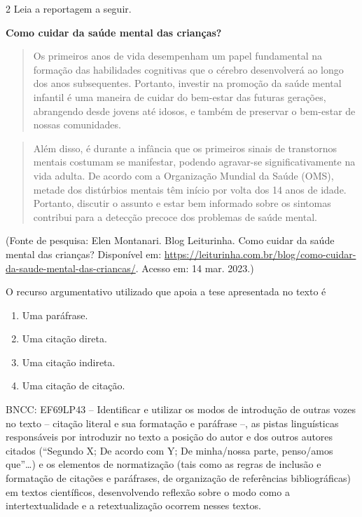\num{2} Leia a reportagem a seguir.

\textbf{Como cuidar da saúde mental das crianças?}

\begin{quote}
Os primeiros anos de vida desempenham um papel fundamental na formação
das habilidades cognitivas que o cérebro desenvolverá ao longo dos anos
subsequentes. Portanto, investir na promoção da saúde mental infantil é
uma maneira de cuidar do bem-estar das futuras gerações, abrangendo
desde jovens até idosos, e também de preservar o bem-estar de nossas
comunidades.
\end{quote}

\begin{quote}
Além disso, é durante a infância que os primeiros sinais de transtornos
mentais costumam se manifestar, podendo agravar-se significativamente na
vida adulta. De acordo com a Organização Mundial da Saúde (OMS), metade
dos distúrbios mentais têm início por volta dos 14 anos de idade.
Portanto, discutir o assunto e estar bem informado sobre os sintomas
contribui para a detecção precoce dos problemas de saúde mental.
\end{quote}

(Fonte de pesquisa: Elen Montanari. Blog Leiturinha. Como cuidar da
saúde mental das crianças? Disponível em: 
\url{https://leiturinha.com.br/blog/como-cuidar-da-saude-mental-das-criancas/}.
Acesso em: 14 mar. 2023.)

O recurso argumentativo utilizado que apoia a tese apresentada no texto
é

\begin{enumerate}
\def\labelenumi{\alph{enumi})}
\item Uma paráfrase.
\item Uma citação direta.
\item Uma citação indireta.
\item Uma citação de citação.
\end{enumerate}

BNCC: EF69LP43 -- Identificar e utilizar os modos de introdução de
outras vozes no texto -- citação literal e sua formatação e paráfrase
--, as pistas linguísticas responsáveis por introduzir no texto a
posição do autor e dos outros autores citados (``Segundo X; De acordo
com Y; De minha/nossa parte, penso/amos que''\ldots) e os elementos de
normatização (tais como as regras de inclusão e formatação de citações e
paráfrases, de organização de referências bibliográficas) em textos
científicos, desenvolvendo reflexão sobre o modo como a
intertextualidade e a retextualização ocorrem nesses textos.

